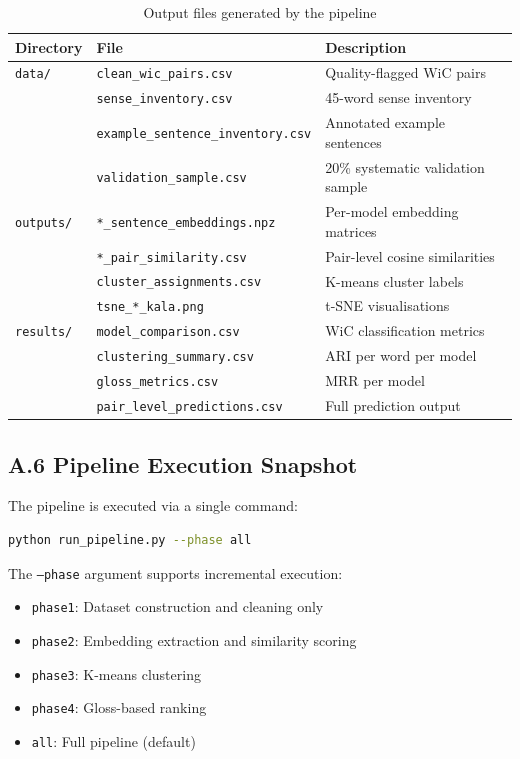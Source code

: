 \documentclass[12pt,a4paper,oneside]{article}
\begin{document}
\begin{table}[H]
\centering
\caption{Output files generated by the pipeline}
\label{tab:files}
\begin{tabular}{l l l}
\toprule
\textbf{Directory} & \textbf{File} & \textbf{Description} \\
\midrule
\texttt{data/} & \texttt{clean\_wic\_pairs.csv} & Quality-flagged WiC pairs \\
& \texttt{sense\_inventory.csv} & 45-word sense inventory \\
& \texttt{example\_sentence\_inventory.csv} & Annotated example sentences \\
& \texttt{validation\_sample.csv} & 20\% systematic validation sample \\
\midrule
\texttt{outputs/} & \texttt{*\_sentence\_embeddings.npz} & Per-model embedding matrices \\
& \texttt{*\_pair\_similarity.csv} & Pair-level cosine similarities \\
& \texttt{cluster\_assignments.csv} & K-means cluster labels \\
& \texttt{tsne\_*\_kala.png} & t-SNE visualisations \\
\midrule
\texttt{results/} & \texttt{model\_comparison.csv} & WiC classification metrics \\
& \texttt{clustering\_summary.csv} & ARI per word per model \\
& \texttt{gloss\_metrics.csv} & MRR per model \\
& \texttt{pair\_level\_predictions.csv} & Full prediction output \\
\bottomrule
\end{tabular}
\end{table}

\subsection*{A.6 Pipeline Execution Snapshot}

The pipeline is executed via a single command:

\begin{lstlisting}[language=bash,caption={Running the full pipeline},label=lst:run]
python run_pipeline.py --phase all
\end{lstlisting}

The \texttt{--phase} argument supports incremental execution:
\begin{itemize}
  \item \texttt{phase1}: Dataset construction and cleaning only
  \item \texttt{phase2}: Embedding extraction and similarity scoring
  \item \texttt{phase3}: K-means clustering
  \item \texttt{phase4}: Gloss-based ranking
  \item \texttt{all}: Full pipeline (default)
\end{itemize}
\end{document}
